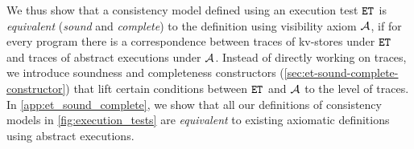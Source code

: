We thus show that a consistency model defined using an execution test \( \et \) is \emph{equivalent}
(\ie \emph{sound} and \emph{complete})
to the definition using visibility axiom \( \visaxioms \),
if for every program there is a correspondence
between traces of kv-stores under \( \et \) and 
traces of abstract executions under \( \visaxioms \).
Instead of directly working on traces,
we introduce soundness and completeness constructors (\cref{sec:et-sound-complete-constructor})
that lift certain conditions between \( \et \) and \( \visaxioms \) to the level of traces. 
In \cref{app:et_sound_complete}, we show that 
all our definitions of consistency models in \cref{fig:execution_tests} 
are \emph{equivalent} to existing axiomatic definitions using abstract executions.
